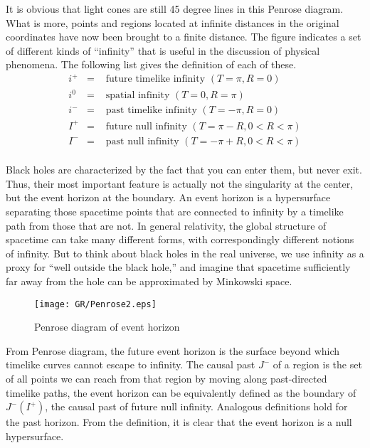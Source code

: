 \noindent
It is obvious that light cones are still 45 degree lines in this Penrose diagram. 
What is more, points and regions located at infinite distances in the original coordinates have now been brought to a finite distance. 
The figure indicates a set of different kinds of ``infinity'' that is useful in the discussion of physical phenomena. The following list gives the definition of each of these.
\begin{eqnarray}
i^{+} &=& \mbox{ future timelike infinity } (T = \pi, R = 0) \nonumber \\
i^{0} &=& \mbox{ spatial infinity } (T = 0, R = \pi) \nonumber \\
i^{-} &=& \mbox{ past timelike infinity } (T = -\pi, R = 0) \nonumber \\
I^{+} &=& \mbox{ future null infinity } (T = \pi - R, 0 < R < \pi) \nonumber \\
I^{-} &=& \mbox{ past null infinity } (T = -\pi + R, 0 < R < \pi) \nonumber
\end{eqnarray}
\\
Black holes are characterized by the fact that you can enter them, but never exit. 
Thus, their most important feature is actually not the singularity at the center, but the event horizon at the boundary. 
An event horizon is a hypersurface separating those spacetime points that are connected to infinity by a timelike path from those that are not. 
In general relativity, the global structure of spacetime can take many different forms, with correspondingly  different notions of infinity. 
But to think about black holes in the real universe, we use infinity as a proxy for ``well outside the black hole,'' and imagine that spacetime sufficiently far away from the hole can be approximated by Minkowski space.
\begin{figure}[!htb]
\centering
\texttt{[image: GR/Penrose2.eps]}
\caption{Penrose diagram of event horizon}
\end{figure}

\noindent
From Penrose diagram, the future event horizon is the surface beyond which timelike curves cannot escape to infinity. 
The causal past $J^{-}$ of a region is the set of all points we can reach from that region by moving along past-directed timelike paths, the event horizon can be
equivalently defined as the boundary of $J^{-}(I^+)$, the causal past of future null infinity. Analogous definitions hold for the past horizon. From the definition, it is clear that the event horizon is a null hypersurface.

